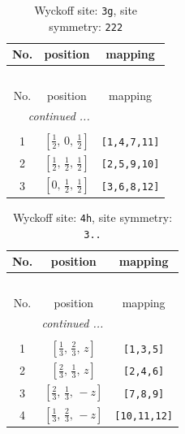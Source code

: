 \documentclass[fleqn,8pt]{jsarticle}
\begin{document}
\begin{longtable}{ccc}
\caption{Wyckoff site: {\tt 3g}, site symmetry: {\tt 222}}
 \\
 \hline \hline
No. & position & mapping \\ \hline \endfirsthead

\multicolumn{2}{l}{\tablename\ \thetable{}} \\
 \hline \hline
No. & position & mapping \\ \hline \endhead

 \hline \hline
\multicolumn{2}{r}{\footnotesize\it continued ...} \\ \endfoot

 \hline \hline
\multicolumn{2}{r}{} \\ \endlastfoot

1 & $\left[ \frac{1}{2},\, 0,\, \frac{1}{2} \right]$ & {\tt [1,4,7,11]} \\ \hline
2 & $\left[ \frac{1}{2},\, \frac{1}{2},\, \frac{1}{2} \right]$ & {\tt [2,5,9,10]} \\ \hline
3 & $\left[ 0,\, \frac{1}{2},\, \frac{1}{2} \right]$ & {\tt [3,6,8,12]} \\
\end{longtable}
\renewcommand{\arraystretch}{1.2}
\begin{longtable}{ccc}
\caption{Wyckoff site: {\tt 4h}, site symmetry: {\tt 3..}}
 \\
 \hline \hline
No. & position & mapping \\ \hline \endfirsthead

\multicolumn{2}{l}{\tablename\ \thetable{}} \\
 \hline \hline
No. & position & mapping \\ \hline \endhead

 \hline \hline
\multicolumn{2}{r}{\footnotesize\it continued ...} \\ \endfoot

 \hline \hline
\multicolumn{2}{r}{} \\ \endlastfoot

1 & $\left[ \frac{1}{3},\, \frac{2}{3},\, z \right]$ & {\tt [1,3,5]} \\ \hline
2 & $\left[ \frac{2}{3},\, \frac{1}{3},\, z \right]$ & {\tt [2,4,6]} \\ \hline
3 & $\left[ \frac{2}{3},\, \frac{1}{3},\, - z \right]$ & {\tt [7,8,9]} \\ \hline
4 & $\left[ \frac{1}{3},\, \frac{2}{3},\, - z \right]$ & {\tt [10,11,12]} \\
\end{longtable}
\end{document}
